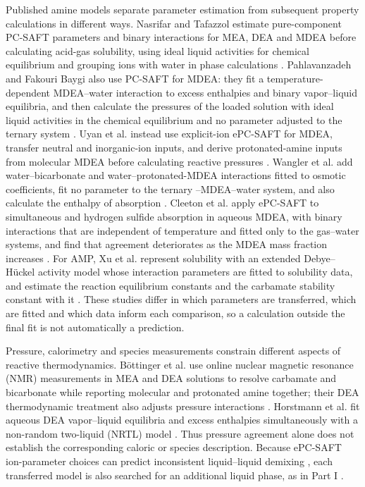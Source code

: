 Published amine models separate parameter estimation from subsequent property calculations in different ways.
Nasrifar and Tafazzol estimate pure-component PC-SAFT parameters and binary interactions for MEA, DEA and MDEA before calculating acid-gas solubility, using ideal liquid activities for chemical equilibrium and grouping ions with water in phase calculations \cite[Sects.~2, 5--6, Tables~2--3]{Nasrifar2010}.
Pahlavanzadeh and Fakouri Baygi also use PC-SAFT for MDEA: they fit a temperature-dependent MDEA--water interaction to excess enthalpies and binary vapor--liquid equilibria, and then calculate the pressures of the loaded solution with ideal liquid activities in the chemical equilibrium and no parameter adjusted to the ternary system \cite[Sects.~3.2.2 and 3.3, Eq.~11]{Pahlavanzadeh2013}.
Uyan et al. instead use explicit-ion ePC-SAFT for MDEA, transfer neutral and inorganic-ion inputs, and derive protonated-amine inputs from molecular MDEA before calculating reactive pressures \cite[Sects.~4.1--4.3, Tables~3--5]{Uyan2015}.
Wangler et al. add water--bicarbonate and water--protonated-MDEA interactions fitted to osmotic coefficients, fit no parameter to the ternary \COtwo--MDEA--water system, and also calculate the enthalpy of absorption \cite[Sects.~6.1.2, 6.1.4, 6.2.1 and 6.3]{Wangler2018}.
Cleeton et al. apply ePC-SAFT to simultaneous \COtwo and hydrogen sulfide absorption in aqueous MDEA, with binary interactions that are independent of temperature and fitted only to the gas--water systems, and find that agreement deteriorates as the MDEA mass fraction increases \cite[Sects.~3.2.2, 3.4.2 and 4]{Cleeton2020}.
For AMP, Xu et al. represent \COtwo solubility with an extended Debye--H\"uckel activity model whose interaction parameters are fitted to solubility data, and estimate the reaction equilibrium constants and the carbamate stability constant with it \cite[Mathematical modelling, p.~9; Results and analysis, pp.~9--11, Tables~1--2]{xuRepresentationEquilibriumSolubility1992}.
These studies differ in which parameters are transferred, which are fitted and which data inform each comparison, so a calculation outside the final fit is not automatically a prediction.

Pressure, calorimetry and species measurements constrain different aspects of reactive thermodynamics.
B\"ottinger et al. use online nuclear magnetic resonance (NMR) measurements in MEA and DEA solutions to resolve carbamate and bicarbonate while reporting molecular and protonated amine together; their DEA thermodynamic treatment also adjusts pressure interactions \cite[Sects.~3, 5--7, Tables~7--8, Fig.~8]{Bottinger2008}.
Horstmann et al. fit aqueous DEA vapor--liquid equilibria and excess enthalpies simultaneously with a non-random two-liquid (NRTL) model \cite[pp.~1496--1500, Tables~6--7, Fig.~4(b)]{horstmannPhaseEquilibriumExcess2002}.
Thus pressure agreement alone does not establish the corresponding caloric or species description.
Because ePC-SAFT ion-parameter choices can predict inconsistent liquid--liquid demixing \cite[Sect.~2.4]{Held2014}, each transferred model is also searched for an additional liquid phase, as in Part I \cite[Sect.~3.4]{PolleyPartI}.

